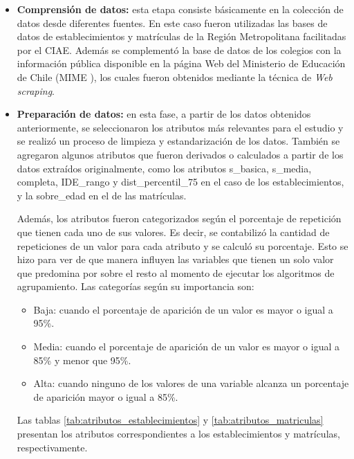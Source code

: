 \begin{itemize}
    \item \textbf{Comprensión de datos:} esta etapa consiste básicamente en la colección de datos desde diferentes fuentes. En este caso fueron utilizadas las bases de datos de establecimientos y matrículas de la Región Metropolitana facilitadas por el CIAE. Además se complementó la base de datos de los colegios con la información pública disponible en la página Web del Ministerio de Educación de Chile (MIME \cite{MIME}), los cuales fueron obtenidos mediante la técnica de \textit{Web scraping}.
    
    \item \textbf{Preparación de datos:} en esta fase, a partir de los datos obtenidos anteriormente, se seleccionaron los atributos más relevantes para el estudio y se realizó un proceso de limpieza y estandarización de los datos. También se agregaron algunos atributos que fueron derivados o calculados a partir de los datos extraídos originalmente, como los atributos s\_basica, s\_media, completa, IDE\_rango y dist\_percentil\_75 en el caso de los establecimientos, y la sobre\_edad en el de las matrículas. 
    
    Además, los atributos fueron categorizados según el porcentaje de repetición que tienen cada uno de sus valores. Es decir, se contabilizó la cantidad de repeticiones de un valor para cada atributo y se calculó su porcentaje. Esto se hizo para ver de que manera influyen las variables que tienen un solo valor que predomina por sobre el resto al momento de ejecutar los algoritmos de agrupamiento. Las categorías según su importancia son:
    
    \begin{itemize}
    \item Baja: cuando el porcentaje de aparición de un valor es mayor o igual a 95\%. 
    \item Media: cuando el porcentaje de aparición de un valor es mayor o igual a 85\% y menor que 95\%.
    \item Alta: cuando ninguno de los valores de una variable alcanza un porcentaje de aparición mayor o igual a 85\%.
\end{itemize}

Las tablas \ref{tab:atributos_establecimientos} y \ref{tab:atributos_matriculas} presentan los atributos correspondientes a los establecimientos y matrículas, respectivamente.


\end{itemize}
